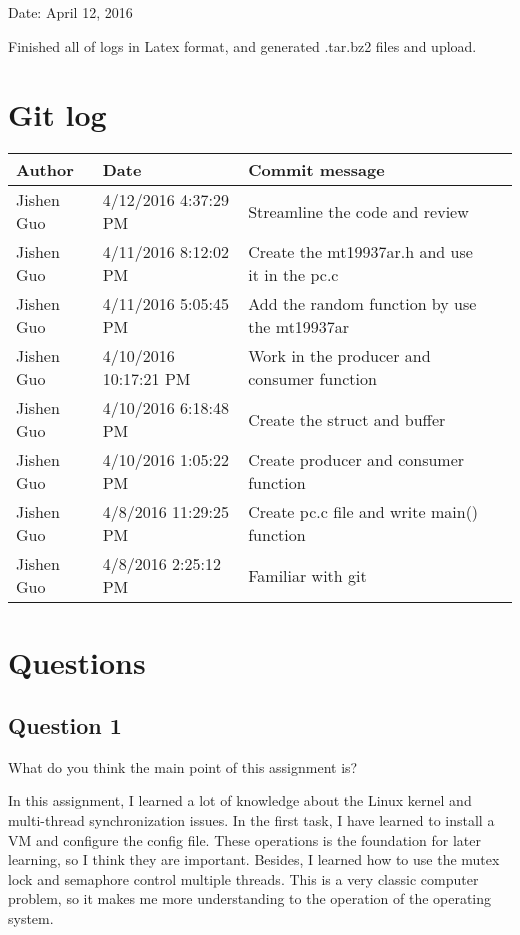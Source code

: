 \documentclass[10pt,draftclsnofoot,peerreview,letterpaper,onecolumn,]{IEEEtran}
\begin{document}
Date: April 12, 2016

Finished all of logs in Latex format, and generated .tar.bz2 files and upload.

\newpage
\section{Git log}

\begin{table}[h]
\centering
\begin{tabular}{|l|l|l|l|}
\hline

Author    & Date & Commit message        
\\ \hline
Jishen Guo & 4/12/2016 4:37:29 PM & Streamline the code and review
\\ \hline
Jishen Guo & 4/11/2016 8:12:02 PM & Create the mt19937ar.h and use it in the pc.c
\\ \hline
Jishen Guo & 4/11/2016 5:05:45 PM & Add the random function by use the mt19937ar
\\ \hline
Jishen Guo & 4/10/2016 10:17:21 PM & Work in the producer and consumer function
\\ \hline
Jishen Guo & 4/10/2016 6:18:48 PM & Create the struct and buffer
\\ \hline
Jishen Guo & 4/10/2016 1:05:22 PM & Create producer and consumer function
\\ \hline
Jishen Guo & 4/8/2016 11:29:25 PM & Create pc.c file and write main() function
\\ \hline
Jishen Guo & 4/8/2016 2:25:12 PM & Familiar with git
\\ \hline
\end{tabular}
\end{table}
\newpage

\section{Questions}
\subsection{Question 1}
 
What do you think the main point of this assignment is?

In this assignment, I learned a lot of knowledge about the Linux kernel and multi-thread synchronization issues. In the first task, I have learned to install a VM and configure the config file. These operations is the foundation for later learning, so I think they are important. Besides, I learned how to use the mutex lock and semaphore control multiple threads. This is a very classic computer problem, so it makes me more understanding to the operation of the operating system.
\end{document}
